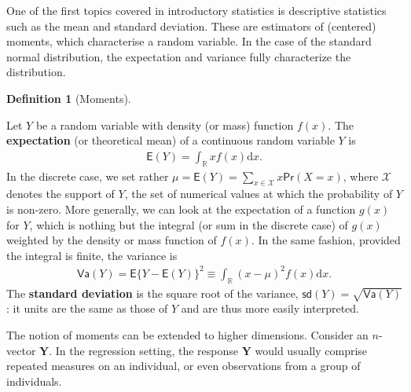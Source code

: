 \documentclass[
  11pt,
  letterpaper,
]{scrbook}
\theoremstyle{plain}
\theoremstyle{definition}
\theoremstyle{definition}
\newtheorem{definition}{Definition}[chapter]
\theoremstyle{remark}
\begin{document}
One of the first topics covered in introductory statistics is
descriptive statistics such as the mean and standard deviation. These
are estimators of (centered) moments, which characterise a random
variable. In the case of the standard normal distribution, the
expectation and variance fully characterize the distribution.

\begin{definition}[Moments]\protect\hypertarget{def-moments}{}\label{def-moments}

Let \(Y\) be a random variable with density (or mass) function \(f(x).\)
The \textbf{expectation} (or theoretical mean) of a continuous random
variable \(Y\) is \begin{align*}
\mathsf{E}(Y)=\int_{\mathbb{R}} x f(x) \mathrm{d} x.
\end{align*} In the discrete case, we set rather
\(\mu = \mathsf{E}(Y)=\sum_{x \in \mathcal{X}} x \mathsf{Pr}(X=x)\),
where \(\mathcal{X}\) denotes the support of \(Y\), the set of numerical
values at which the probability of \(Y\) is non-zero. More generally, we
can look at the expectation of a function \(g(x)\) for \(Y\), which is
nothing but the integral (or sum in the discrete case) of \(g(x)\)
weighted by the density or mass function of \(f(x).\) In the same
fashion, provided the integral is finite, the variance is \begin{align*}
\mathsf{Va}(Y)=\mathsf{E}\{Y-\mathsf{E}(Y)\}^2 \equiv \int_{\mathbb{R}} (x-\mu)^2 f(x) \mathrm{d} x.
\end{align*} The \textbf{standard deviation} is the square root of the
variance, \(\mathsf{sd}(Y)=\sqrt{\mathsf{Va}(Y)}\): it units are the
same as those of \(Y\) and are thus more easily interpreted.

The notion of moments can be extended to higher dimensions. Consider an
\(n\)-vector \(\boldsymbol{Y}.\) In the regression setting, the response
\(\boldsymbol{Y}\) would usually comprise repeated measures on an
individual, or even observations from a group of individuals.


\end{definition}
\end{document}
